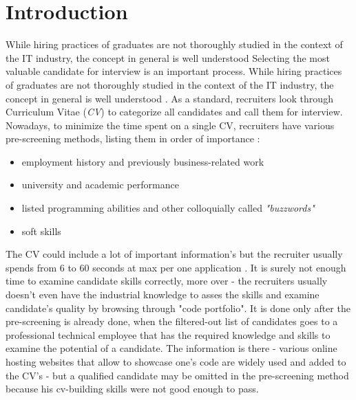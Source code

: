\documentclass[graybox]{svmult}
\begin{document}


%
\section{Introduction}

While hiring practices of graduates are not thoroughly studied in the context of
the IT industry, the concept in general is well understood
Selecting the most valuable candidate for interview is an important process. While hiring practices of graduates are not thoroughly studied in the context of the IT industry, the concept in general is well understood \cite{HiringProcess}. As a standard, recruiters look through Curriculum Vitae (\emph{CV}) to categorize all candidates and call them for interview. Nowadays, to minimize the time spent on a single CV, recruiters have various pre-screening methods, listing them in order of importance \cite{SantanderCVLectureScholarship}:
\begin{itemize}
  \item employment history and previously business-related work
  \item university and academic performance
  \item listed programming abilities and other colloquially called \emph{"buzzwords"}
  \item soft skills
\end{itemize}

The CV could include a lot of important information's but the recruiter usually spends from 6 to 60 seconds at max per one application \cite{SantanderCVLectureScholarship}. It is surely not enough time to examine candidate skills correctly, more over - the recruiters usually doesn't even have the industrial knowledge to asses the skills and examine candidate's quality by browsing through "code portfolio". It is done only after the pre-screening is already done, when the filtered-out list of candidates goes to a professional technical employee that has the required knowledge and skills to examine the potential of a candidate. The information is there - various online hosting websites that allow to showcase one's code are widely used and added to the CV's - but a qualified candidate may be omitted in the pre-screening method because his cv-building skills were not good enough to pass. 
\end{document}
